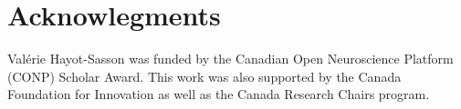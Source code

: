 \documentclass[10pt,journal,compsoc]{IEEEtran}
\begin{document}

%



\section*{Acknowlegments}
Val\'erie Hayot-Sasson was funded by the Canadian Open Neuroscience Platform (CONP) Scholar Award.
This work was also supported by the Canada Foundation for Innovation as well as the Canada Research Chairs program.

\end{document}
